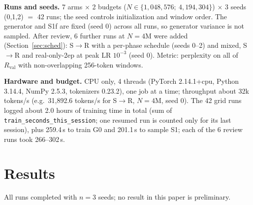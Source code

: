 \documentclass[conference]{IEEEtran}
\newcommand{\SR}{S$\to$R}
\begin{document}
\textbf{Runs and seeds.} 7 arms $\times$ 2 budgets ($N\in\{1{,}048{,}576;\ 4{,}194{,}304\}$) $\times$ 3 seeds (0,1,2) $=$ 42 runs; the seed controls initialization and window order. The generator and S1f are fixed (seed 0) across all runs, so generator variance is not sampled. After review, 6 further runs at $N{=}4$M were added (Section~\ref{sec:sched}): \SR{} with a per-phase schedule (seeds 0--2) and mixed, \SR{} and real-only-2ep at peak LR $10^{-3}$ (seed 0). Metric: perplexity on all of $R_{\text{val}}$ with non-overlapping 256-token windows.

\textbf{Hardware and budget.} CPU only, 4 threads (PyTorch 2.14.1+cpu, Python 3.14.4, NumPy 2.5.3, tokenizers 0.23.2), one job at a time; throughput about 32k tokens/s (e.g.\ 31,892.6 tokens/s for \SR, $N{=}4$M, seed 0). The 42 grid runs logged about 2.0 hours of training time in total (sum of \texttt{train\_seconds\_this\_session}; one resumed run is counted only for its last session), plus 259.4\,s to train G0 and 201.1\,s to sample S1; each of the 6 review runs took 266--302\,s.

\section{Results}
All runs completed with $n{=}3$ seeds; no result in this paper is preliminary.
\end{document}

